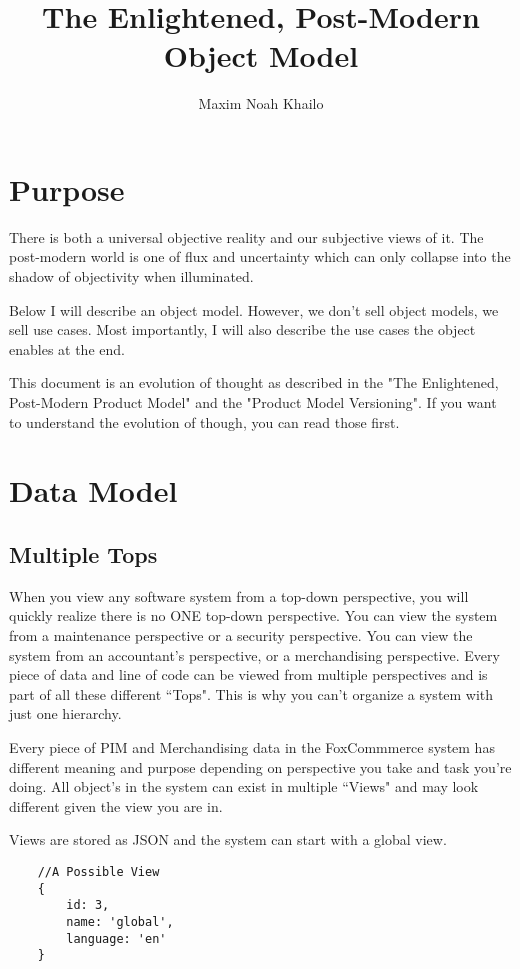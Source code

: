 \documentclass[11pt]{article}
\title{The Enlightened, Post-Modern Object Model}
\author{Maxim Noah Khailo}
\begin{document}
\maketitle
\section{Purpose}

There is both a universal objective reality and our subjective views of 
it. The post-modern world is one of flux and uncertainty which can only collapse
into the shadow of objectivity when illuminated. 

Below I will describe an object model. However, we don't sell object models, we
sell use cases. Most importantly, I will also describe the use cases the object 
enables at the end.

This document is an evolution of thought as described in the 
"The Enlightened, Post-Modern Product Model" and the "Product Model Versioning". 
If you want to understand the evolution of though, you can read those first.

\section{Data Model}
\subsection{Multiple Tops}

When you view any software system from a top-down perspective, you will quickly realize
there is no ONE top-down perspective. You can view the system from a maintenance perspective
or a security perspective. You can view the system from an accountant's perspective,
or a merchandising perspective. Every piece of data and line of code can be
viewed from multiple perspectives and is part of all these different ``Tops". 
This is why you can't organize a system with just one hierarchy. 

Every piece of PIM and Merchandising data in the FoxCommmerce system has different
meaning and purpose depending on perspective you take and task you're doing. 
All object's in the system can exist in multiple ``Views" and may look different 
given the view you are in.

Views are stored as JSON and the system can start with a global view.

\begin{lstlisting}
    //A Possible View
    {
        id: 3,
        name: 'global',
        language: 'en'
    }
\end{lstlisting}
\end{document}
